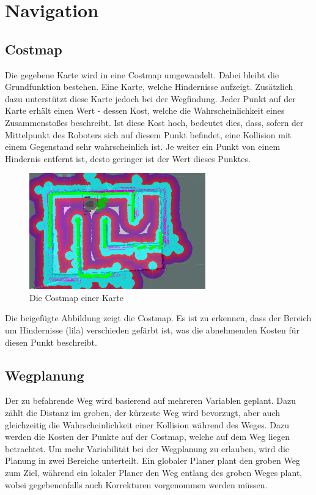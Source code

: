 \section{Navigation}
{	
		\subsection{Costmap}
		{
			Die gegebene Karte wird in eine Costmap umgewandelt. Dabei bleibt die Grundfunktion bestehen. Eine Karte, welche Hindernisse aufzeigt. Zusätzlich dazu unterstützt diese Karte jedoch bei der Wegfindung. Jeder Punkt auf der Karte erhält einen Wert - dessen Kost, welche die Wahrscheinlichkeit eines Zusammenstoßes beschreibt. Ist diese Kost hoch, bedeutet dies, dass, sofern der Mittelpunkt des Roboters sich auf diesem Punkt befindet, eine Kollision mit einem Gegenstand sehr wahrscheinlich ist. Je weiter ein Punkt von einem Hindernis entfernt ist, desto geringer ist der Wert dieses Punktes. 
			\begin{figure}[H]
				\centering				\includegraphics[height=5cm]{Bilder/costmap_overlayed.png}
				\caption{Die Costmap einer Karte} 
				\label{pic:costmapoverlayed}
			\end{figure}
			Die beigefügte Abbildung zeigt die Costmap. Es ist zu erkennen, dass der Bereich um Hindernisse (lila) verschieden gefärbt ist, was die abnehmenden Kosten für diesen Punkt beschreibt.
		}
	
		\subsection{Wegplanung}
		{
			Der zu befahrende Weg wird basierend auf mehreren Variablen geplant. Dazu zählt die Distanz im groben, \dahe der kürzeste Weg wird bevorzugt, aber auch gleichzeitig die Wahrscheinlichkeit einer Kollision während des Weges. Dazu werden die Kosten der Punkte auf der Costmap, welche auf dem Weg liegen betrachtet. Um mehr Variabilität bei der Wegplanung zu erlauben, wird die Planung in zwei Bereiche unterteilt. Ein globaler Planer plant den groben Weg zum Ziel, während ein lokaler Planer den Weg entlang des groben Weges plant, wobei gegebenenfalls auch Korrekturen vorgenommen werden müssen.
			
}}
